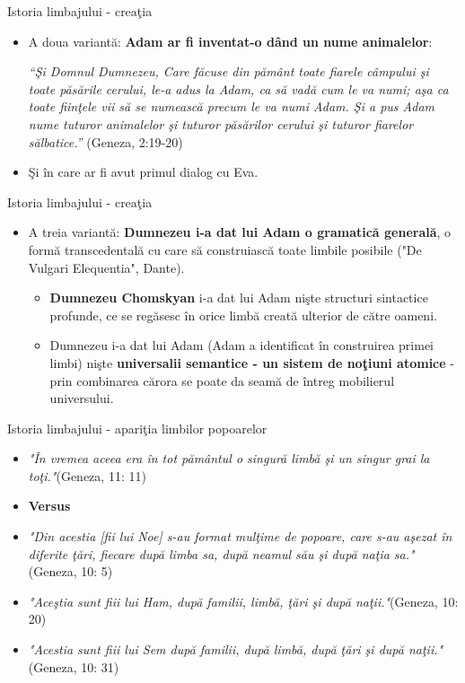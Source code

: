 \documentclass[pdf]{beamer}
\begin{document}
\begin{frame}{Istoria limbajului - creaţia}
\begin{itemize}
\item
A doua variantă: \textbf{Adam ar fi inventat-o dând un nume animalelor}:

\textit{“Şi Domnul Dumnezeu, Care făcuse din pământ toate fiarele câmpului şi toate păsările cerului, le-a adus la Adam, ca să vadă cum le va numi; aşa ca toate fiinţele vii să se numească precum le va numi Adam. Şi a pus Adam nume tuturor animalelor şi tuturor păsărilor cerului şi tuturor fiarelor sălbatice.”} (Geneza, 2:19-20)
\item
Şi în care ar fi avut primul dialog cu Eva.
\end{itemize}
\end{frame}



\begin{frame}{Istoria limbajului - creaţia}
\begin{itemize}
\item
A treia variantă: \textbf{Dumnezeu i-a dat lui Adam o gramatică generală}, o formă transcedentală cu care să construiască toate limbile posibile ("De Vulgari Elequentia", Dante).
\begin{itemize}
\item
\textbf{Dumnezeu Chomskyan} i-a dat lui Adam nişte structuri sintactice profunde, ce se regăsesc în orice limbă creată ulterior de către oameni.
\item
Dumnezeu i-a dat lui Adam (Adam a identificat în construirea primei limbi) nişte \textbf{universalii semantice - un sistem de noţiuni atomice} - prin combinarea cărora se poate da seamă de întreg mobilierul universului.
\end{itemize}
\end{itemize}
\end{frame}



\begin{frame}{Istoria limbajului - apariţia limbilor popoarelor}
\begin{itemize}
\item
\textit{"În vremea aceea era în tot pământul o singură limbă şi un singur grai la toţi."}(Geneza, 11: 11)
\item
\textbf{Versus}
\item
\textit{"Din acestia [fii lui Noe] s-au format mulţime de popoare, care s-au aşezat în diferite ţări, fiecare după limba sa, după neamul său şi după naţia sa."}(Geneza, 10: 5)
\item
\textit{"Aceştia sunt fiii lui Ham, după familii, limbă, ţări şi după naţii."}(Geneza, 10: 20)
\item
\textit{"Acestia sunt fiii lui Sem după familii, după limbă, după ţări şi după naţii."}(Geneza, 10: 31)
\end{itemize}
\end{frame}
\end{document}
